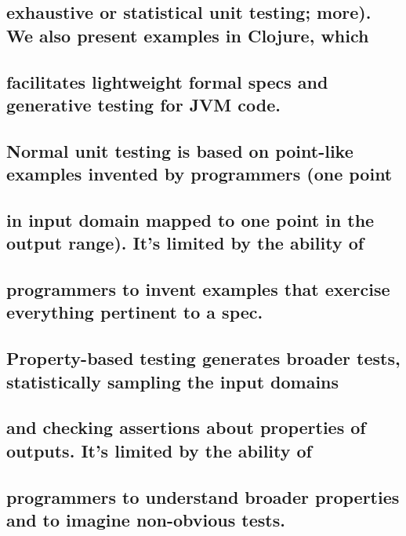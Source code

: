 \documentclass[10pt,oneside,x11names]{article}
\begin{document}
\subsection{exhaustive or statistical unit testing; more). We also present examples in Clojure, which}
\label{sec:orgdd07adf}
\subsection{facilitates lightweight formal specs and generative testing for JVM code.}
\label{sec:org11d8af1}

\subsection{Normal unit testing is based on point-like examples invented by programmers (one point}
\label{sec:orgff6fb0b}
\subsection{in input domain mapped to one point in the output range). It's limited by the ability of}
\label{sec:orga5f8a05}
\subsection{programmers to invent examples that exercise everything pertinent to a spec.}
\label{sec:orga46a19a}
\subsection{Property-based testing generates broader tests, statistically sampling the input domains}
\label{sec:org4cc8068}
\subsection{and checking assertions about properties of outputs. It's limited by the ability of}
\label{sec:org8997bf7}
\subsection{programmers to understand broader properties and to imagine non-obvious tests.}
\label{sec:org34cc854}
\end{document}
